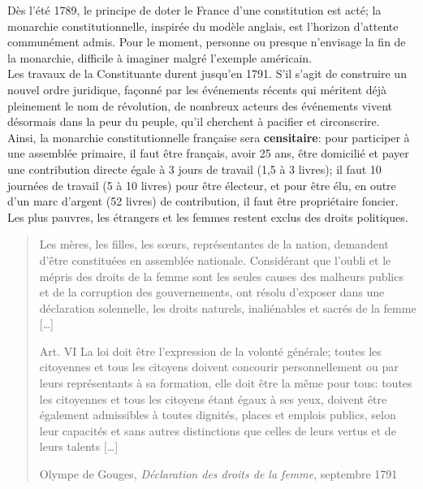\documentclass[
  french,
  letterpaper,
  DIV=11,
  numbers=noendperiod]{scrartcl}
\begin{document}
Dès l'été 1789, le principe de doter le France d'une constitution est
acté; la monarchie constitutionnelle, inspirée du modèle anglais, est
l'horizon d'attente communément admis. Pour le moment, personne ou
presque n'envisage la fin de la monarchie, difficile à imaginer malgré
l'exemple américain.\\
Les travaux de la Constituante durent jusqu'en 1791. S'il s'agit de
construire un nouvel ordre juridique, façonné par les événements récents
qui méritent déjà pleinement le nom de révolution, de nombreux acteurs
des événements vivent désormais dans la peur du peuple, qu'il cherchent
à pacifier et circonscrire.\\
Ainsi, la monarchie constitutionnelle française sera
\textbf{censitaire}: pour participer à une assemblée primaire, il faut
être français, avoir 25 ans, être domicilié et payer une contribution
directe égale à 3 jours de travail (1,5 à 3 livres); il faut 10 journées
de travail (5 à 10 livres) pour être électeur, et pour être élu, en
outre d'un marc d'argent (52 livres) de contribution, il faut être
propriétaire foncier. Les plus pauvres, les étrangers et les femmes
restent exclus des droits politiques.

\begin{quote}
Les mères, les filles, les sœurs, représentantes de la nation, demandent
d'être constituées en assemblée nationale. Considérant que l'oubli et le
mépris des droits de la femme sont les seules causes des malheurs
publics et de la corruption des gouvernements, ont résolu d'exposer dans
une déclaration solennelle, les droits naturels, inaliénables et sacrés
de la femme {[}\ldots{]}

Art. VI La loi doit être l'expression de la volonté générale; toutes les
citoyennes et tous les citoyens doivent concourir personnellement ou par
leurs représentants à sa formation, elle doit être la même pour tous:
toutes les citoyennes et tous les citoyens étant égaux à ses yeux,
doivent être également admissibles à toutes dignités, places et emplois
publics, selon leur capacités et sans autres distinctions que celles de
leurs vertus et de leurs talents {[}\ldots{]}

Olympe de Gouges, \emph{Déclaration des droits de la femme}, septembre
1791
\end{quote}
\end{document}
